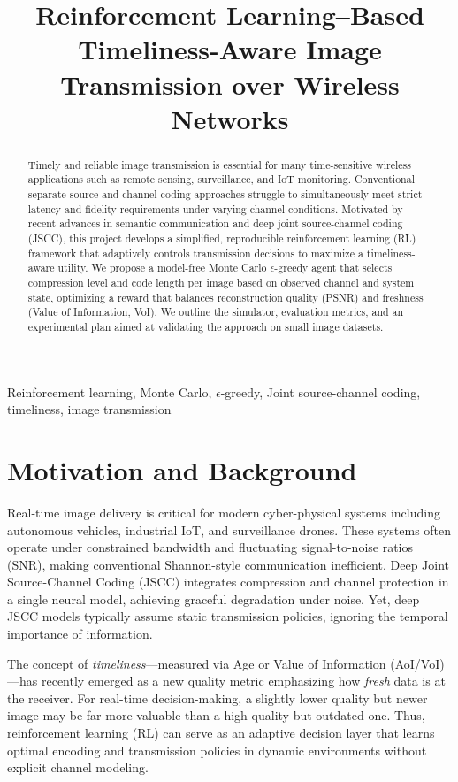 \documentclass[conference]{IEEEtran}
\title{Reinforcement Learning–Based Timeliness-Aware Image Transmission over Wireless Networks}
\author{\IEEEauthorblockN{Miadzvedzeva Viktoryia}
\IEEEauthorblockA{Student ID: 202530202013 \\ Email: vemedvedeva@edu.hse.ru \\ University: Higher School of Economics}
}
\begin{document}
\maketitle

\begin{abstract}
Timely and reliable image transmission is essential for many time-sensitive wireless applications such as remote sensing, surveillance, and IoT monitoring. Conventional separate source and channel coding approaches struggle to simultaneously meet strict latency and fidelity requirements under varying channel conditions. Motivated by recent advances in semantic communication and deep joint source-channel coding (JSCC), this project develops a simplified, reproducible reinforcement learning (RL) framework that adaptively controls transmission decisions to maximize a timeliness-aware utility. We propose a model-free Monte Carlo $\epsilon$-greedy agent that selects compression level and code length per image based on observed channel and system state, optimizing a reward that balances reconstruction quality (PSNR) and freshness (Value of Information, VoI). We outline the simulator, evaluation metrics, and an experimental plan aimed at validating the approach on small image datasets.
\end{abstract}

\begin{IEEEkeywords}
Reinforcement learning, Monte Carlo, $\epsilon$-greedy, Joint source-channel coding, timeliness, image transmission
\end{IEEEkeywords}

\section{Motivation and Background}
Real-time image delivery is critical for modern cyber-physical systems including autonomous vehicles, industrial IoT, and surveillance drones. These systems often operate under constrained bandwidth and fluctuating signal-to-noise ratios (SNR), making conventional Shannon-style communication inefficient. Deep Joint Source-Channel Coding (JSCC) \cite{bourtsoulatze2019deep} integrates compression and channel protection in a single neural model, achieving graceful degradation under noise. Yet, deep JSCC models typically assume static transmission policies, ignoring the temporal importance of information.

The concept of \textit{timeliness}—measured via Age or Value of Information (AoI/VoI) \cite{wang2022voi}—has recently emerged as a new quality metric emphasizing how \textit{fresh} data is at the receiver. For real-time decision-making, a slightly lower quality but newer image may be far more valuable than a high-quality but outdated one. Thus, reinforcement learning (RL) can serve as an adaptive decision layer that learns optimal encoding and transmission policies in dynamic environments without explicit channel modeling.
\end{document}
